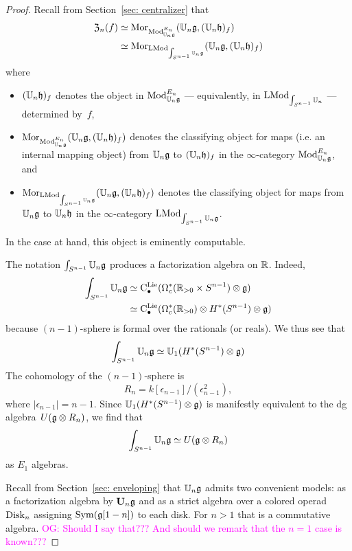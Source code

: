\documentclass[11pt]{amsart}
\numberwithin{equation}{section}
\def\owen{\textcolor{magenta}{OG: }\textcolor{magenta}}
\begin{document}
\begin{proof}
Recall from Section~\ref{sec: centralizer} that 
\begin{align*}
{\frak Z}_n(f) &\simeq {{\rm Mor}}_{{\rm Mod}^{E_n}_{\mathbb U_n\mathfrak g}}(\mathbb U_n \mathfrak g, (\mathbb U_n \mathfrak h)_f) \\
&\simeq {\rm Mor}_{{\rm LMod}_{\int_{S^{n-1}} \mathbb U_n\mathfrak g}}(\mathbb U_n \mathfrak g, (\mathbb U_n \mathfrak h)_f)
\end{align*}
where 
\begin{itemize}
\item $(\mathbb U_n \mathfrak h)_f$ denotes the object in ${\rm Mod}^{E_n}_{\mathbb U_n\mathfrak g}$ --- equivalently, in ${\rm LMod}_{\int_{S^{n-1}}\mathbb U_n}$ --- determined by~$f$, 
\item ${\rm Mor}_{{\rm Mod}^{E_n}_{\mathbb U_n\mathfrak g}}(\mathbb U_n \mathfrak g, (\mathbb U_n \mathfrak h)_f)$ denotes the classifying object for maps (i.e. an internal mapping object) from $\mathbb U_n\mathfrak g$ to $(\mathbb U_n \mathfrak h)_f$ in the $\infty$-category ${\rm Mod}^{E_n}_{\mathbb U_n\mathfrak g}$, and
\item ${\rm Mor}_{{\rm LMod}_{\int_{S^{n-1}} \mathbb U_n\mathfrak g}} (\mathbb U_n \mathfrak g, (\mathbb U_n \mathfrak h)_f)$ denotes the classifying object for maps from ${\mathbb U_n\mathfrak g}$ to $\mathbb U_n \mathfrak h$ in the $\infty$-category ${\rm LMod}_{\int_{S^{n-1}}\mathbb U_n\mathfrak g}$. 
\end{itemize}
In the case at hand, this object is eminently computable.

The notation $\int_{S^{n-1}}\mathbb U_n\mathfrak g$ produces a factorization algebra on $\mathbb R$.
Indeed,
\begin{align*}
\int_{S^{n-1}}\mathbb U_n\mathfrak g 
&\simeq {\rm C}^{\rm Lie}_\bullet(\Omega^*_c(\mathbb R_{> 0} \times S^{n-1}) \otimes \mathfrak g)\\
&\simeq {\rm C}^{\rm Lie}_\bullet(\Omega^*_c(\mathbb R_{> 0}) \otimes H^*(S^{n-1}) \otimes \mathfrak g)
\end{align*}
because $(n-1)$-sphere is formal over the rationals (or reals). 
We thus see that 
\[
\int_{S^{n-1}}\mathbb U_n\mathfrak g \simeq \mathbb U_1 (H^*(S^{n-1}) \otimes \mathfrak g)
\]
The cohomology of the $(n-1)$-sphere is 
\[
R_n = k[\epsilon_{n-1}]/(\epsilon_{n-1}^2),
\] 
where $|\epsilon_{n-1}| = n-1$.
Since $\mathbb U_1 (H^*(S^{n-1}) \otimes \mathfrak g)$ is manifestly equivalent to the dg algebra~$U(\mathfrak g \otimes R_n)$,
we find that 
\[
\int_{S^{n-1}}\mathbb U_n\mathfrak g \simeq U(\mathfrak g \otimes R_n)
\]
as $E_1$ algebras.

Recall from Section~\ref{sec: enveloping} that $\mathbb U_n \mathfrak g$ admits two convenient models:
as a factorization algebra by $\mathbf U_n \mathfrak g$ and as a strict algebra over a colored operad ${\rm Disk}_n$ assigning ${\rm Sym}(\mathfrak g[1-n])$ to each disk.
For $n > 1$ that is a commutative algebra.
\owen{Should I say that??? And should we remark that the $n=1$ case is known???}


\end{proof}
\end{document}

